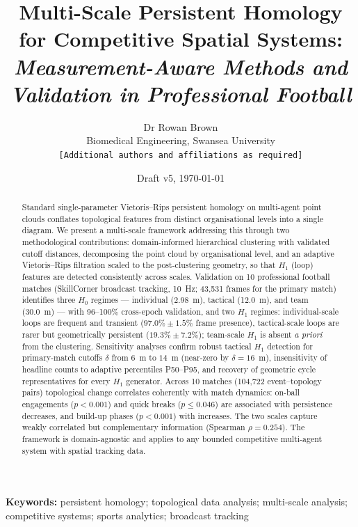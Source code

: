 \documentclass[11pt,a4paper]{article}
\title{Multi-Scale Persistent Homology for Competitive Spatial Systems:\\
\textit{Measurement-Aware Methods and Validation in Professional Football}}
\author{%
  Dr Rowan Brown\\
  Biomedical Engineering, Swansea University\\
  \texttt{[Additional authors and affiliations as required]}
}
\date{Draft v5, \today}
\begin{document}
\maketitle

\begin{abstract}
\noindent
Standard single-parameter Vietoris--Rips persistent homology on multi-agent point clouds conflates topological features from distinct organisational levels into a single diagram. We present a multi-scale framework addressing this through two methodological contributions: domain-informed hierarchical clustering with validated cutoff distances, decomposing the point cloud by organisational level, and an adaptive Vietoris--Rips filtration scaled to the post-clustering geometry, so that $H_1$ (loop) features are detected consistently across scales. Validation on 10 professional football matches (SkillCorner broadcast tracking, 10~Hz; 43{,}531 frames for the primary match) identifies three $H_0$ regimes --- individual (2.98~m), tactical (12.0~m), and team (30.0~m) --- with 96--100\% cross-epoch validation, and two $H_1$ regimes: individual-scale loops are frequent and transient ($97.0\% \pm 1.5\%$ frame presence), tactical-scale loops are rarer but geometrically persistent ($19.3\% \pm 7.2\%$); team-scale $H_1$ is absent \emph{a priori} from the clustering. Sensitivity analyses confirm robust tactical $H_1$ detection for primary-match cutoffs $\delta$ from $6$~m to $14$~m (near-zero by $\delta=16$~m), insensitivity of headline counts to adaptive percentiles P50--P95, and recovery of geometric cycle representatives for every $H_1$ generator. Across 10 matches (104{,}722 event--topology pairs) topological change correlates coherently with match dynamics: on-ball engagements ($p<0.001$) and quick breaks ($p\le 0.046$) are associated with persistence decreases, and build-up phases ($p<0.001$) with increases. The two scales capture weakly correlated but complementary information (Spearman $\rho = 0.254$). The framework is domain-agnostic and applies to any bounded competitive multi-agent system with spatial tracking data.
\end{abstract}

\medskip
\noindent\textbf{Keywords:} persistent homology; topological data analysis; multi-scale analysis; competitive systems; sports analytics; broadcast tracking






\end{document}
